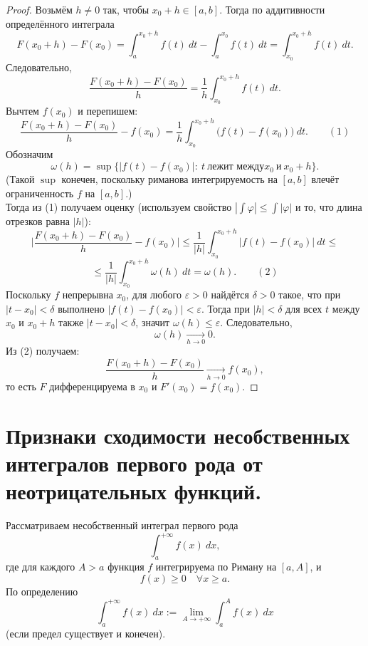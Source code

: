 \documentclass[14pt]{extreport}
\begin{document}
    \begin{proof}
        Возьмём $h \neq 0$ так, чтобы $x_0+h \in [a,b]$. Тогда по аддитивности определённого интеграла
        \[
        F(x_0+h) - F(x_0) = \int_a^{x_0+h} f(t)\ dt - \int_a^{x_0} f(t)\ dt = \int_{x_0}^{x_0+h} f(t)\ dt.
        \]
        Следовательно,
        \[
        \frac{F(x_0+h) - F(x_0)}{h} = \frac{1}{h} \int_{x_0}^{x_0+h} f(t)\ dt.
        \]
        Вычтем $f(x_0)$ и перепишем:
        \[
        \frac{F(x_0+h) - F(x_0)}{h} - f(x_0) = \frac{1}{h} \int_{x_0}^{x_0+h} \bigl( f(t)-f(x_0) \bigr)\ dt. \qquad (1)
        \]
        Обозначим
        \[
        \omega(h) = \sup \{ |f(t)-f(x_0)|:\ t\ \text{лежит между} x_0\ \text{и}\ x_0+h \}.
        \]
        (Такой $\sup$ конечен, поскольку риманова интегрируемость на $[a,b]$ влечёт ограниченность $f$ на $[a,b]$.)\\
        Тогда из (1) получаем оценку (используем свойство $|\int \varphi| \leq \int |\varphi|$ и то, что длина отрезков равна $|h|$):
        \[
        \Bigg| \frac{F(x_0+h) - F(x_0)}{h} - f(x_0) \Bigg| \leq \frac{1}{|h|} \int_{x_0}^{x_0+h} |f(t)-f(x_0)|\ dt \leq
        \]
        \vspace{-0.6cm}
        \[
        \leq \frac{1}{|h|} \int_{x_0}^{x_0+h} \omega(h)\ dt = \omega(h). \qquad (2)
        \]
        Поскольку $f$ непрерывна $x_0$, для любого $\varepsilon>0$ найдётся $\delta>0$ такое, что при $|t-x_0|<\delta$ выполнено $|f(t)-f(x_0)|<\varepsilon$. Тогда при $|h| < \delta$ для всех $t$ между $x_0$ и $x_0+h$ также $|t-x_0|<\delta$, значит $\omega(h) \leq \varepsilon$. Следовательно,
        \[
        \omega(h) \xrightarrow[h \rightarrow 0]\ 0.
        \]
        Из (2) получаем:
        \[
        \frac{F(x_0+h) - F(x_0)}{h} \xrightarrow[h \rightarrow 0]\ f(x_0),
        \]
        то есть $F$ дифференцируема в $x_0$ и $F'(x_0) = f(x_0)$.
    \end{proof}



    \chapter{Признаки сходимости несобственных интегралов первого рода от неотрицательных функций.}

    Рассматриваем несобственный интеграл первого рода
    \[
    \int_a^{+\infty} f(x)\ dx,
    \]
    где для каждого $A>a$ функция $f$ интегрируема по Риману на $[a,A]$, и
    \[
    f(x) \geq 0 \quad \forall x \geq a.
    \]
    По определению
    \[
    \int_a^{+\infty} f(x)\ dx := \lim_{A \rightarrow +\infty} \int_a^A f(x)\ dx
    \]
    (если предел существует и конечен).
\end{document}
